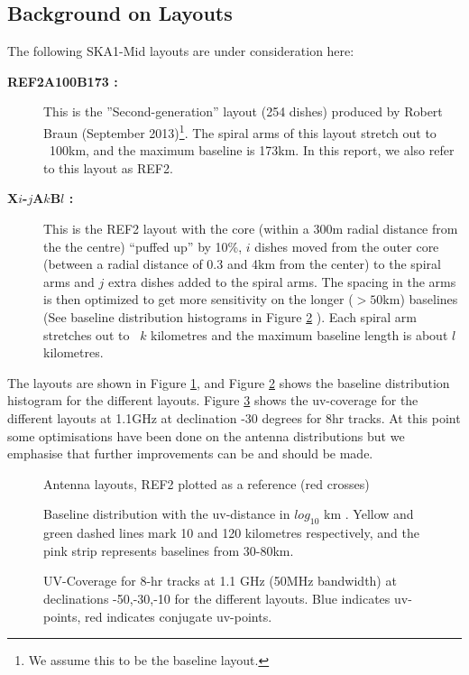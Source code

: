 \documentclass[sfheadings,a4paper,times,9pt,floats,floatfix]{article}
\begin{document}
\subsection{Background on Layouts}\label{sec:layouts}
\vspace{-.1cm}
The following SKA1-Mid layouts are under consideration here:
\begin{description}
\item[{\bf REF2A100B173 :}] This is the ”Second-generation” layout (254 dishes) produced by Robert Braun (September
2013)\footnote{We assume this to be the baseline layout.}. The spiral arms of this layout stretch out to ~100km, and the maximum
baseline is 173km. In this report, we also refer to this layout as REF2. \item[{\bf X$i$-$j$A$k$B$l$ :}] This is the REF2 layout
with the core (within a 300m radial distance from the the centre) ``puffed up'' by 10\%, $i$ dishes moved from the outer core
(between a radial distance of 0.3 and 4km from the center) to the spiral arms and $j$ extra dishes added to the spiral arms. The
spacing in the arms is then optimized to get more sensitivity on the longer ($>50$km) baselines (See baseline distribution
histograms in Figure \ref{fig:hist} ). Each spiral arm stretches out to ~$k$ kilometres and the maximum baseline length is about
$l$ kilometres.
\end{description}
The  layouts are shown in Figure \ref{fig:lay}, and Figure \ref{fig:hist} shows the baseline distribution histogram for the
different layouts. Figure \ref{fig:uvcov} shows the uv-coverage for the different layouts at 1.1GHz at declination -30 degrees for
8hr tracks. At this point some optimisations have been done on the antenna distributions but we emphasise that further
improvements can be and should be made.
\begin{figure}[!htp]
 \tiny{}
 \caption{Antenna layouts, REF2 plotted as a reference (red crosses)}\label{fig:lay}
\end{figure}

\begin{figure}[!htb]
 \tiny{}
 \caption{Baseline distribution with the uv-distance in $log_{10}$ km . Yellow and green dashed lines mark 10 and 120
kilometres respectively, and the pink strip represents baselines from 30-80km.}\label{fig:hist}
\end{figure}

\begin{figure}[!htb]
 \tiny{}
 \caption{UV-Coverage for 8-hr tracks at 1.1 GHz (50MHz bandwidth) at declinations -50,-30,-10 for the different layouts. Blue
indicates uv-points, red indicates conjugate uv-points.}\label{fig:uvcov}
\end{figure}    
\end{document}
